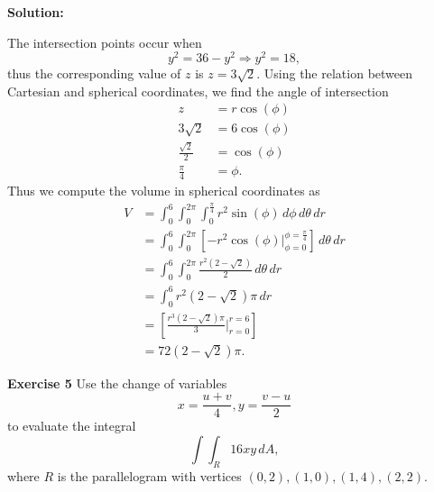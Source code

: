 \documentclass[12pt,oneside]{exam}
\newenvironment{exercise}[1]{\vspace{.1in}\noindent\textbf{Exercise #1 \hspace{.05em}}}{}
\newenvironment{newsolution}{\vspace{.1in}\noindent\textbf{Solution: \hspace{.05em}}}{}
\begin{document}
\begin{newsolution}
\begin{center}
\end{center}
The intersection points occur when
\begin{equation*}
y^2 = 36-y^2 \Rightarrow y^2 = 18,
\end{equation*}
thus the corresponding value of $z$ is $z=3\sqrt{2}$. Using the relation between Cartesian and spherical coordinates, we find the angle of intersection
\begin{align*}
z & = r\cos(\phi) \\
3\sqrt{2} & = 6\cos(\phi) \\
\frac{\sqrt{2}}{2} & = \cos(\phi) \\
\frac{\pi}{4} & = \phi.
\end{align*} 
Thus we compute the volume in spherical coordinates as 
\begin{align*}
V & = \int_{0}^{6} \int_{0}^{2\pi} \int_{0}^{\frac{\pi}{4}} r^2\sin(\phi) \, d\phi \, d\theta \, dr \\
& = \int_{0}^{6} \int_{0}^{2\pi} \left[ -r^2\cos(\phi) \Big|_{\phi =0}^{\phi = \frac{\pi}{4}} \right] \, d\theta \, dr\\
& = \int_{0}^{6} \int_{0}^{2\pi} \frac{r^2(2-\sqrt{2})}{2} \, d\theta \, dr \\
& = \int_{0}^{6} r^2(2-\sqrt{2})\pi \, dr \\
& = \left[ \frac{r^3(2-\sqrt{2})\pi}{3} \Big|_{r=0}^{r=6} \right] \\
& = 72(2-\sqrt{2})\pi.
\end{align*}
\end{newsolution}

\begin{exercise}{5}
Use the change of variables
\begin{equation*}
x = \frac{u+v}{4}, y=\frac{v-u}{2}
\end{equation*}
to evaluate the integral 
\begin{equation*}
\int\int_{R} 16xy \, dA,
\end{equation*}
where $R$ is the parallelogram with vertices $(0,2),(1,0),(1,4),(2,2)$.
\end{exercise}
\end{document}
